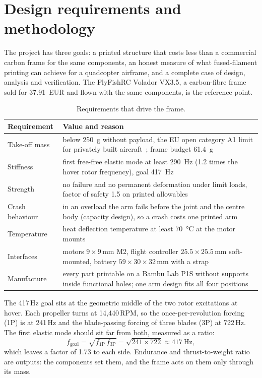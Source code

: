 \section{Design requirements and methodology}\label{sec:requirements}

The project has three goals: a printed structure that costs less than a commercial carbon frame for the same components, an honest measure of what fused-filament printing can achieve for a quadcopter airframe, and a complete case of design, analysis and verification. The FlyFishRC Volador VX3.5, a carbon-fibre frame sold for \SI{37.91}{EUR} and flown with the same components, is the reference point.

\begin{table}[htbp]
\centering\small
\caption{Requirements that drive the frame.}\label{tab:requirements}
\begin{tabularx}{\linewidth}{@{}lX@{}}
\toprule
Requirement & Value and reason\\
\midrule
Take-off mass & below \SI{250}{\gram} without payload, the EU open category A1 limit for privately built aircraft~\citep{eu_2019_947}; frame budget \SI{61.4}{\gram}\\
Stiffness & first free-free elastic mode at least \SI{290}{\hertz} (1.2 times the hover rotor frequency), goal \SI{417}{\hertz}\\
Strength & no failure and no permanent deformation under limit loads, factor of safety 1.5 on printed allowables\\
Crash behaviour & in an overload the arm fails before the joint and the centre body (capacity design), so a crash costs one printed arm\\
Temperature & heat deflection temperature at least \SI{70}{\celsius} at the motor mounts\\
Interfaces & motors $9\times9$\,mm M2, flight controller $25.5\times25.5$\,mm soft-mounted, battery $59\times30\times32$\,mm with a strap\\
Manufacture & every part printable on a Bambu Lab P1S without supports inside functional holes; one arm design fits all four positions\\
\bottomrule
\end{tabularx}
\end{table}

The 417\,Hz goal sits at the geometric middle of the two rotor excitations at hover. Each propeller turns at 14,440\,RPM, so the once-per-revolution forcing (1P) is at 241\,Hz and the blade-passing forcing of three blades (3P) at 722\,Hz. The first elastic mode should sit far from both, measured as a ratio:
\begin{equation}
f_\text{goal} = \sqrt{f_\text{1P}\, f_\text{3P}} = \sqrt{241 \times 722} \approx \SI{417}{\hertz},
\end{equation}
which leaves a factor of 1.73 to each side. Endurance and thrust-to-weight ratio are outputs: the components set them, and the frame acts on them only through its mass.
